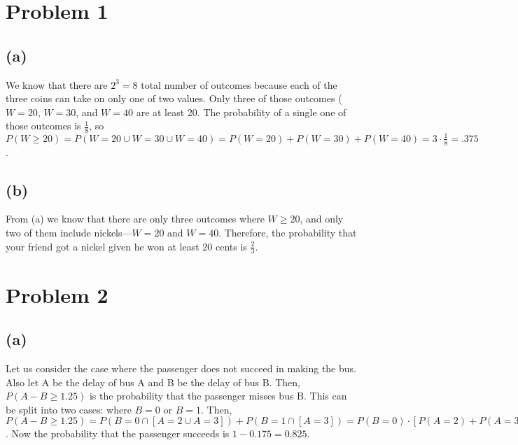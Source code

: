 \documentclass{article}
\begin{document}
\thispagestyle{fancy}

\list{} \item \endlist

\section*{Problem 1} 

\subsection*{(a)}

We know that there are $2^{3} = 8$ total number of outcomes because each of the
three coins can take on only one of two values. Only three of those outcomes
($W = 20$, $W = 30$, and $W=40$ are at least 20. The probability of a single
one of those outcomes is $\frac{1}{8}$, so $P(W \geq 20)=P( W = 20 \cup W=30
\cup W=40 )=P( W = 20 ) + P( W = 30 ) + P( W = 40 ) = 3 \cdot \frac{1}{8} =
.375$.

\subsection*{(b)}

From (a) we know that there are only three outcomes where $W \geq 20$, and only
two of them include nickels---$W = 20$ and $W = 40$. Therefore, the probability
that your friend got a nickel given he won at least 20 cents is $\frac{2}{3}$.

\section*{Problem 2}

\subsection*{(a)}

Let us consider the case where the passenger does not succeed in making the
bus. Also let A be the delay of bus A and B be the delay of bus B. Then, $P(A -
B \geq 1.25)$ is the probability that the passenger misses bus B. This can be
split into two cases: where $B = 0$ or $B = 1$. Then, $P( A - B \geq 1.25 ) =
P( B = 0 \cap [A = 2 \cup A = 3] ) + P( B = 1 \cap [A = 3]) = P(B=0)\cdot [P(A
= 2 ) + P( A = 3 ) ] + P(B=1)\cdot P(A = 3 ) = 0.5\cdot (0.15 + 0.1) + 0.5\cdot
0.1 = 0.175$. Now the probability that the passenger succeeds is $1 - 0.175 =
0.825$.
\end{document}
